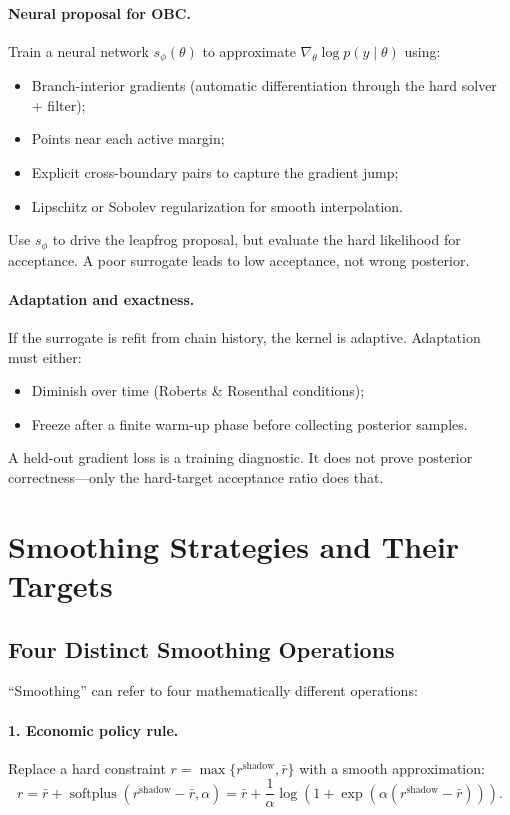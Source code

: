\paragraph{Neural proposal for OBC.}
Train a neural network $s_\phi(\theta)$ to approximate $\nabla_\theta \log
p(y \mid \theta)$ using:
\begin{itemize}
  \item Branch-interior gradients (automatic differentiation through the hard
    solver + filter);
  \item Points near each active margin;
  \item Explicit cross-boundary pairs to capture the gradient jump;
  \item Lipschitz or Sobolev regularization for smooth interpolation.
\end{itemize}

Use $s_\phi$ to drive the leapfrog proposal, but evaluate the hard likelihood
for acceptance. A poor surrogate leads to low acceptance, not wrong posterior.

\paragraph{Adaptation and exactness.}
If the surrogate is refit from chain history, the kernel is adaptive.
Adaptation must either:
\begin{itemize}
  \item Diminish over time (Roberts \& Rosenthal conditions);
  \item Freeze after a finite warm-up phase before collecting posterior
    samples.
\end{itemize}

A held-out gradient loss is a training diagnostic. It does not prove posterior
correctness—only the hard-target acceptance ratio does that.

\section{Smoothing Strategies and Their Targets}

\subsection{Four Distinct Smoothing Operations}

``Smoothing'' can refer to four mathematically different operations:

\paragraph{1. Economic policy rule.}
Replace a hard constraint $r = \max\{r^{\text{shadow}}, \bar{r}\}$ with a
smooth approximation:
\begin{equation}
  r = \bar{r} + \operatorname{softplus}(r^{\text{shadow}} - \bar{r}, \alpha)
  = \bar{r} + \frac{1}{\alpha} \log(1 + \exp(\alpha (r^{\text{shadow}} - \bar{r}))).
  \label{eq:softplus-rule}
\end{equation}


